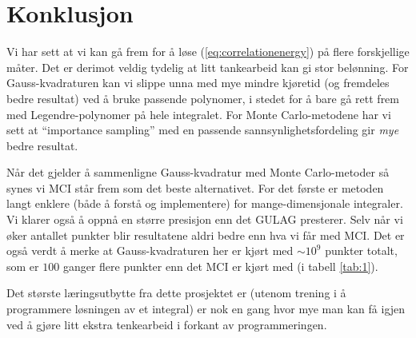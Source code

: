 \documentclass[11pt]{article}
\begin{document}
\section{Konklusjon}
Vi har sett at vi kan gå frem for å løse (\ref{eq:correlationenergy})
på flere forskjellige måter. Det er derimot veldig tydelig at litt
tankearbeid kan gi stor belønning. For Gauss-kvadraturen kan vi slippe
unna med mye mindre kjøretid (og fremdeles bedre resultat) ved å bruke
passende polynomer, i stedet for å bare gå rett frem med
Legendre-polynomer på hele integralet. For Monte Carlo-metodene har vi
sett at ``importance sampling'' med en passende
sannsynlighetsfordeling gir \textit{mye} bedre resultat. 

Når det gjelder å sammenligne Gauss-kvadratur med Monte Carlo-metoder
så synes vi MCI står frem som det beste alternativet. For det første
er metoden langt enklere (både å forstå og implementere) for
mange-dimensjonale integraler. Vi klarer også å oppnå en større presisjon enn det GULAG presterer. Selv
når vi øker antallet punkter blir resultatene aldri bedre enn hva vi
får med MCI. Det er også verdt å merke at Gauss-kvadraturen her er
kjørt med $\sim 10^9$ punkter totalt, som er $100$ ganger
flere punkter enn det MCI er kjørt med (i tabell \ref{tab:1}). 


Det største læringsutbytte fra dette prosjektet er (utenom trening i å
programmere løsningen av et integral) er nok en gang hvor mye man kan
få igjen ved å gjøre litt ekstra tenkearbeid i forkant av
programmeringen. 

\clearpage
\printbibliography
\end{document}
